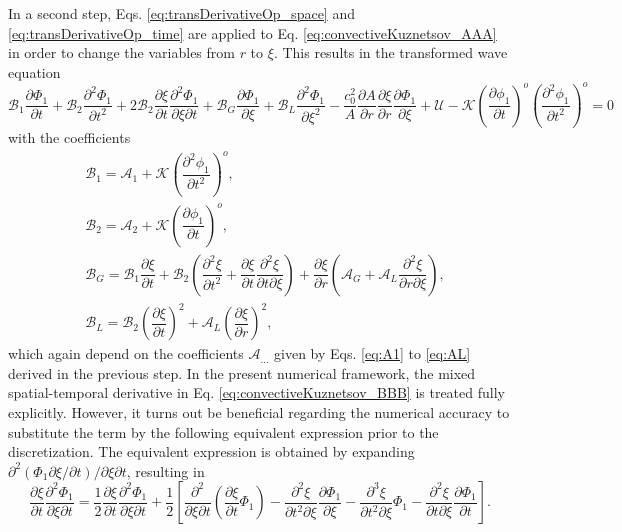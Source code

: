 In a second step, Eqs. \eqref{eq:transDerivativeOp_space} and \eqref{eq:transDerivativeOp_time} are applied to Eq. \eqref{eq:convectiveKuznetsov_AAA} in order to change the variables from $r$ to $\xi$. This results in the transformed wave equation
\begin{equation}
\mathcal{B}_1 \dfrac{\partial \Phi_1}{\partial t}
+ \mathcal{B}_2 \dfrac{\partial^2 \Phi_1}{\partial t^2}
+ 2\mathcal{B}_2 \dfrac{\partial \xi}{\partial t} \dfrac{\partial^2 \Phi_1}{\partial \xi\partial t}
+ \mathcal{B}_G \dfrac{\partial \Phi_1}{\partial \xi}
+ \mathcal{B}_L \dfrac{\partial^2 \Phi_1}{\partial \xi^2}
- \dfrac{c_0^2}{A}\dfrac{\partial A}{\partial r} \dfrac{\partial \xi}{\partial r}\dfrac{\partial \Phi_1}{\partial \xi}
+ \mathcal{U}
- \mathcal{K}\left(\dfrac{\partial \phi_1}{\partial t}\right)^o\left(\dfrac{\partial^2 \phi_1}{\partial t^2}\right)^o
= 0
\label{eq:convectiveKuznetsov_BBB}
\end{equation}
with the coefficients
\begin{align}
& \mathcal{B}_1 = \mathcal{A}_1 + \mathcal{K}\left(\dfrac{\partial^2 \phi_1}{\partial t^2}\right)^o,
\label{eq:B1} \\
& \mathcal{B}_2 = \mathcal{A}_2 + \mathcal{K}\left(\dfrac{\partial \phi_1}{\partial t}\right)^o,
\label{eq:B2} \\
& \mathcal{B}_G =
\mathcal{B}_1\dfrac{\partial \xi}{\partial t}
+ \mathcal{B}_2\left(\dfrac{\partial^2\xi}{\partial t^2} + \dfrac{\partial \xi}{\partial t} \dfrac{\partial^2\xi}{\partial t\partial \xi}\right)
+ \dfrac{\partial \xi}{\partial r}\left(\mathcal{A}_G
+ \mathcal{A}_L\dfrac{\partial^2\xi}{\partial r\partial \xi}\right),
\label{eq:BG} \\
& \mathcal{B}_L = \mathcal{B}_2\left(\dfrac{\partial \xi}{\partial t}\right)^2 + \mathcal{A}_L\left(\dfrac{\partial \xi}{\partial r}\right)^2,
\label{eq:BL}
\end{align}
which again depend on the coefficients $\mathcal{A}_{...}$ given by Eqs. \eqref{eq:A1} to \eqref{eq:AL} derived in the previous step. In the present numerical framework, the mixed spatial-temporal derivative in Eq. \eqref{eq:convectiveKuznetsov_BBB} is treated fully explicitly. However, it turns out be beneficial regarding the numerical accuracy to substitute the term by the following equivalent expression prior to the discretization. The equivalent expression is obtained by expanding $\partial^2\left(\Phi_1\partial\xi/\partial t\right)/\partial \xi \partial t$, resulting in
\begin{equation}
\dfrac{\partial \xi}{\partial t} \dfrac{\partial^2 \Phi_1}{\partial \xi\partial t}
= \dfrac{1}{2}\dfrac{\partial \xi}{\partial t} \dfrac{\partial^2 \Phi_1}{\partial \xi\partial t} +
\dfrac{1}{2}\left[
\dfrac{\partial^2}{\partial \xi\partial t}\left(\dfrac{\partial \xi}{\partial t}\Phi_1\right)
- \dfrac{\partial^2 \xi}{\partial t^2 \partial \xi} \dfrac{\partial \Phi_1}{\partial \xi}
- \dfrac{\partial^3 \xi}{\partial t^2\partial \xi}\Phi_1
- \dfrac{\partial^2 \xi}{\partial t \partial \xi} \dfrac{\partial \Phi_1}{\partial t}\right].
\label{eq:mixedTerm}
\end{equation}
